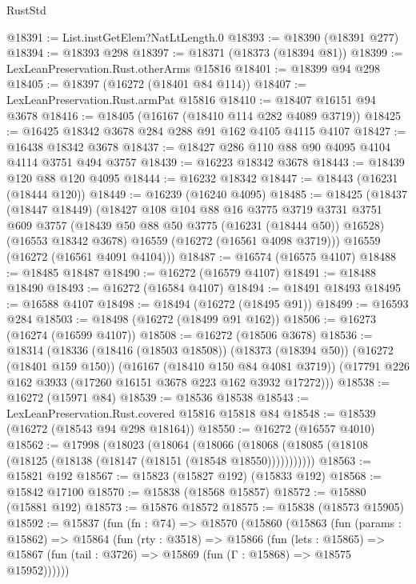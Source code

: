 \begin{lexlean}{RustStd}
\begin{coremodule}
@18391 := List.instGetElem?NatLtLength.{0}
@18393 := @18390 (@18391 @277)
@18394 := @18393 @298
@18397 := @18371 (@18373 (@18394 @81))
@18399 := LexLeanPreservation.Rust.otherArms @15816
@18401 := @18399 @94 @298
@18405 := @18397 (@16272 (@18401 @84 @114))
@18407 := LexLeanPreservation.Rust.armPat @15816
@18410 := @18407 @16151 @94 @3678
@18416 := @18405 (@16167 (@18410 @114 @282 @4089 @3719))
@18425 := @16425 @18342 @3678 @284 @288 @91 @162 @4105 @4115 @4107
@18427 := @16438 @18342 @3678
@18437 := @18427 @286 @110 @88 @90 @4095 @4104 @4114 @3751 @494 @3757
@18439 := @16223 @18342 @3678
@18443 := @18439 @120 @88 @120 @4095
@18444 := @16232 @18342
@18447 := @18443 (@16231 (@18444 @120))
@18449 := @16239 (@16240 @4095)
@18485 := @18425
    (@18437
      (@18447 @18449)
      (@18427
        @108
        @104
        @88
        @16
        @3775
        @3719
        @3731
        @3751
        @609
        @3757
        (@18439 @50 @88 @50 @3775 (@16231 (@18444 @50)) @16528)
        (@16553 @18342 @3678)
        @16559
        (@16272 (@16561 @4098 @3719)))
      @16559
      (@16272 (@16561 @4091 @4104)))
@18487 := @16574 (@16575 @4107)
@18488 := @18485 @18487
@18490 := @16272 (@16579 @4107)
@18491 := @18488 @18490
@18493 := @16272 (@16584 @4107)
@18494 := @18491 @18493
@18495 := @16588 @4107
@18498 := @18494 (@16272 (@18495 @91))
@18499 := @16593 @284
@18503 := @18498 (@16272 (@18499 @91 @162))
@18506 := @16273 (@16274 (@16599 @4107))
@18508 := @16272 (@18506 @3678)
@18536 := @18314
    (@18336
      (@18416 (@18503 @18508))
      (@18373 (@18394 @50))
      (@16272 (@18401 @159 @150))
      (@16167 (@18410 @150 @84 @4081 @3719))
      (@17791 @226 @162 @3933 (@17260 @16151 @3678 @223 @162 @3932 @17272)))
@18538 := @16272 (@15971 @84)
@18539 := @18536 @18538
@18543 := LexLeanPreservation.Rust.covered @15816 @15818 @84
@18548 := @18539 (@16272 (@18543 @94 @298 @18164))
@18550 := @16272 (@16557 @4010)
@18562 := @17998
    (@18023
      (@18064
        (@18066 (@18068 (@18085 (@18108 (@18125 (@18138 (@18147 (@18151 (@18548 @18550)))))))))))
@18563 := @15821 @192
@18567 := @15823 (@15827 @192) (@15833 @192)
@18568 := @15842 @17100
@18570 := @15838 (@18568 @15857)
@18572 := @15880 (@15881 @192)
@18573 := @15876 @18572
@18575 := @15838 (@18573 @15905)
@18592 := @15837
    (fun (fn : @74) =>
    @18570
      (@15860
        (@15863
          (fun (params : @15862) =>
          @15864
            (fun (rty : @3518) =>
            @15866
              (fun (lets : @15865) =>
              @15867 (fun (tail : @3726) => @15869 (fun (Γ : @15868) => @18575 @15952))))))

\end{coremodule}
\end{lexlean}
